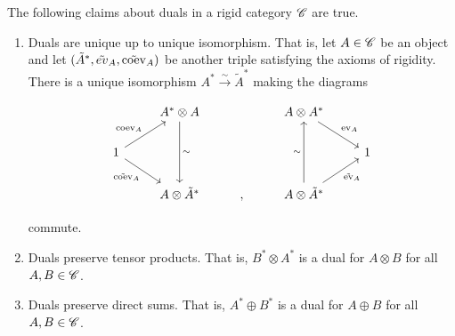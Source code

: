 \begin{proposition}\label{rigidity} The following claims about duals in a rigid category $\mathscr{C}$ are true.

\begin{enumerate}
\item Duals are unique up to unique isomorphism. That is, let $A\in \mathscr{C}$ be an object and let $(\tilde{A}^{*},\tilde{ev}_A,\tilde{\operatorname{coev}}_A)$ be another triple satisfying the axioms of rigidity. There is a unique isomorphism $A^{*}\xrightarrow{\sim}\tilde{A}^{*}$ making the diagrams

\[\begin{tikzcd}
	& {A^{*}\otimes A} && {A\otimes A^{*}} \\
	1 &&&& 1 \\
	& {A\otimes \tilde{A}^*} & {,} & {A\otimes \tilde{A}^{*}}
	\arrow["{\coev_A}", from=2-1, to=1-2]
	\arrow["{\tilde{\coev}_A}"', from=2-1, to=3-2]
	\arrow["\sim", from=1-2, to=3-2]
	\arrow["\sim", from=3-4, to=1-4]
	\arrow["{\ev_A}", from=1-4, to=2-5]
	\arrow["{\tilde{\ev}_A}"', from=3-4, to=2-5]
\end{tikzcd}\]

commute.

\item Duals preserve tensor products. That is, $B^{*}\otimes A^*$ is a dual for $A\otimes B$ for all $A,B\in \mathscr{C}$.

\item Duals preserve direct sums. That is, $A^*\oplus B^*$ is a dual for $A\oplus B$ for all $A,B\in \mathscr{C}$.
\end{enumerate}
\end{proposition}
